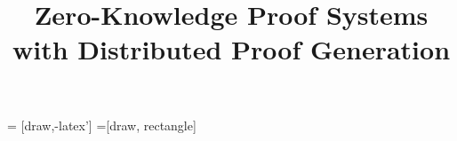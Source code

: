 \documentclass[runningheads]{llncs}
\title{Zero-Knowledge Proof Systems with Distributed Proof Generation}
\begin{document}
\maketitle

 = [draw,-latex']
=[draw, rectangle]





















%
%
%
%
%



	
\end{document}

